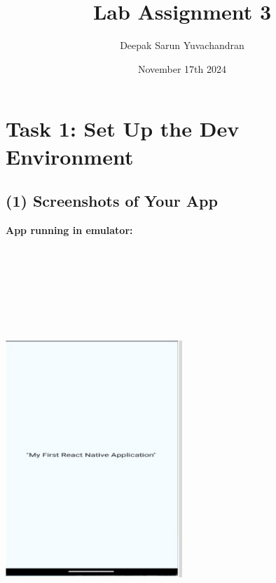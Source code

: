 \documentclass[12pt]{article}
\title{Lab Assignment 3}
\author{Deepak Sarun Yuvachandran}
\date{November 17th 2024}
\begin{document}
\maketitle


\section*{Task 1: Set Up the Dev Environment}

\subsection*{(1) Screenshots of Your App}

\textbf{App running in emulator:}
\begin{center}
    \includegraphics[width=0.5\textwidth, height=16cm]{images/emulator.png.jpg} 
\end{center}
\end{document}
